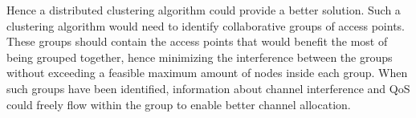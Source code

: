 Hence a distributed clustering algorithm could provide a better solution. Such a clustering algorithm would need to identify collaborative groups of access points.
These groups should contain the access points that would benefit the most of being grouped together, hence minimizing the interference between the groups 
without exceeding a feasible maximum amount of nodes inside each group. When such groups have been identified, information about channel interference and QoS could freely flow within the group
to enable better channel allocation. 








